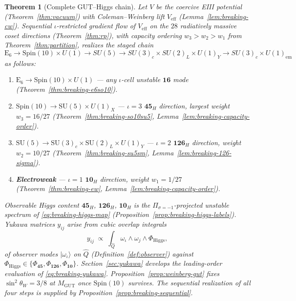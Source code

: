 \documentclass[aps,prd,onecolumn,amsmath,amssymb,nofootinbib,11pt]{revtex4-2}
\numberwithin{equation}{section}
\theoremstyle{plain}
\newtheorem{theorem}{Theorem}[section]
\theoremstyle{definition}
\theoremstyle{remark}
\newcommand{\E}[1]{\mathrm{E}_{#1}}
\newcommand{\Spin}{\mathrm{Spin}}
\begin{document}
\begin{theorem}[Complete GUT--Higgs chain]\label{thm:breaking-complete}
Let $V$ be the coercive EIII potential (Theorem~\ref{thm:vacuum}) with
Coleman--Weinberg lift $V_{\mathrm{eff}}$ (Lemma~\ref{lem:breaking-cw}).
Sequential $\iota$-restricted gradient flow of $V_{\mathrm{eff}}$ on the $28$
radiatively massive coset directions (Theorem~\ref{thm:rp}), with capacity
ordering $w_3>w_2>w_1$ from Theorem~\ref{thm:partition}, realizes the staged
chain
\begin{equation}\label{eq:breaking-chain}
  \E{6}\to\Spin(10)\times U(1)\to SU(5)\to SU(3)_c\times SU(2)_L\times U(1)_Y
  \to SU(3)_c\times U(1)_{\mathrm{em}}
\end{equation}
as follows:
\begin{enumerate}[label=\textbf{(\arabic*)},leftmargin=*]
  \item \textbf{$\E{6}\to\Spin(10)\times U(1)$} --- any $\iota$-cell unstable
    $\mathbf{16}$ mode (Theorem~\ref{thm:breaking-e6so10}).
  \item \textbf{$\Spin(10)\to\mathrm{SU}(5)\times U(1)_X$} --- $\iota=3$
    $\mathbf{45}_H$ direction, largest weight $w_3=16/27$
    (Theorem~\ref{thm:breaking-so10su5},
    Lemma~\ref{lem:breaking-capacity-order}).
  \item \textbf{$\mathrm{SU}(5)\to\mathrm{SU}(3)_c\times\mathrm{SU}(2)_L
    \times U(1)_Y$} --- $\iota=2$ $\mathbf{126}_H$ direction, weight
    $w_2=10/27$ (Theorem~\ref{thm:breaking-su5sm},
    Lemma~\ref{lem:breaking-126-sigma}).
  \item \textbf{Electroweak} --- $\iota=1$ $\mathbf{10}_H$ direction, weight
    $w_1=1/27$ (Theorem~\ref{thm:breaking-ew},
    Lemma~\ref{lem:breaking-capacity-order}).
\end{enumerate}
Observable Higgs content $\mathbf{45}_H$, $\mathbf{126}_H$, $\mathbf{10}_H$ is
the $\Pi_{\sigma=-1}$-projected unstable spectrum of
\eqref{eq:breaking-higgs-map} (Proposition~\ref{prop:breaking-higgs-labels}).
Yukawa matrices $y_{ij}$ arise from cubic overlap integrals
\begin{equation}\label{eq:breaking-yukawa}
  y_{ij}\;\propto\;\int_{\hat Q}\omega_\iota\wedge\omega_j\wedge\Phi_{\mathrm{Higgs}},
\end{equation}
of observer modes $|\omega_\iota\rangle$ on $\hat Q$
(Definition~\ref{def:observer}) against $\Phi_{\mathrm{Higgs}}\in\{\Phi_{\mathbf{45}},
\Phi_{\mathbf{126}},\Phi_{\mathbf{10}}\}$. Section~\ref{sec:yukawa} develops
the leading-order evaluation of \eqref{eq:breaking-yukawa}.
Proposition~\ref{prop:weinberg-gut} fixes $\sin^2\theta_W=3/8$ at
$M_{\mathrm{GUT}}$ once $\Spin(10)$ survives. The sequential realization of all
four steps is supplied by Proposition~\ref{prop:breaking-sequential}.
\end{theorem}
\end{document}
